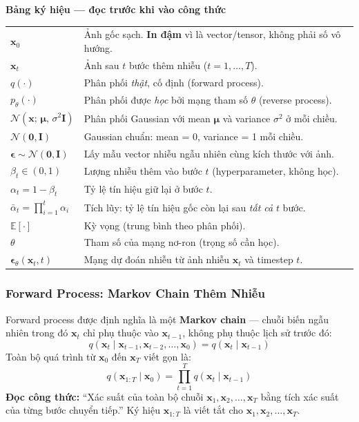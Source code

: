 \begin{mdframed}[style=infobox]
\textbf{Bảng ký hiệu --- đọc trước khi vào công thức}

\begin{tabular}{lp{10cm}}
$\mathbf{x}_0$ & Ảnh gốc sạch. \textbf{In đậm} vì là vector/tensor, không phải số vô hướng. \\
$\mathbf{x}_t$ & Ảnh sau $t$ bước thêm nhiễu ($t = 1, \ldots, T$). \\
$q(\cdot)$ & Phân phối \textit{thật}, cố định (forward process). \\
$p_\theta(\cdot)$ & Phân phối được \textit{học} bởi mạng tham số $\theta$ (reverse process). \\
$\mathcal{N}(\mathbf{x};\,\boldsymbol{\mu},\,\sigma^2\mathbf{I})$ & Phân phối Gaussian với mean $\boldsymbol{\mu}$ và variance $\sigma^2$ ở mỗi chiều. \\
$\mathcal{N}(\mathbf{0},\mathbf{I})$ & Gaussian chuẩn: mean = 0, variance = 1 mỗi chiều. \\
$\boldsymbol{\epsilon} \sim \mathcal{N}(\mathbf{0},\mathbf{I})$ & Lấy mẫu vector nhiễu ngẫu nhiên cùng kích thước với ảnh. \\
$\beta_t \in (0,1)$ & Lượng nhiễu thêm vào bước $t$ (hyperparameter, không học). \\
$\alpha_t = 1 - \beta_t$ & Tỷ lệ tín hiệu giữ lại ở bước $t$. \\
$\bar{\alpha}_t = \prod_{i=1}^t \alpha_i$ & Tích lũy: tỷ lệ tín hiệu gốc còn lại sau \textit{tất cả} $t$ bước. \\
$\mathbb{E}[\cdot]$ & Kỳ vọng (trung bình theo phân phối). \\
$\theta$ & Tham số của mạng nơ-ron (trọng số cần học). \\
$\boldsymbol{\epsilon}_\theta(\mathbf{x}_t, t)$ & Mạng dự đoán nhiễu từ ảnh nhiễu $\mathbf{x}_t$ và timestep $t$. \\
\end{tabular}
\end{mdframed}

\subsubsection{Forward Process: Markov Chain Thêm Nhiễu}
\label{subsubsec:forward_process}

Forward process được định nghĩa là một \textbf{Markov chain} --- chuỗi biến ngẫu nhiên trong đó $\mathbf{x}_t$ chỉ phụ thuộc vào $\mathbf{x}_{t-1}$, không phụ thuộc lịch sử trước đó:
\[
    q(\mathbf{x}_t \mid \mathbf{x}_{t-1}, \mathbf{x}_{t-2}, \ldots, \mathbf{x}_0) = q(\mathbf{x}_t \mid \mathbf{x}_{t-1})
\]
Toàn bộ quá trình từ $\mathbf{x}_0$ đến $\mathbf{x}_T$ viết gọn là:
\begin{equation}
    q(\mathbf{x}_{1:T} \mid \mathbf{x}_0) = \prod_{t=1}^T q(\mathbf{x}_t \mid \mathbf{x}_{t-1})
\end{equation}
\textbf{Đọc công thức:} ``Xác suất của toàn bộ chuỗi $\mathbf{x}_1, \mathbf{x}_2, \ldots, \mathbf{x}_T$ bằng tích xác suất của từng bước chuyển tiếp.'' Ký hiệu $\mathbf{x}_{1:T}$ là viết tắt cho $\mathbf{x}_1, \mathbf{x}_2, \ldots, \mathbf{x}_T$.

